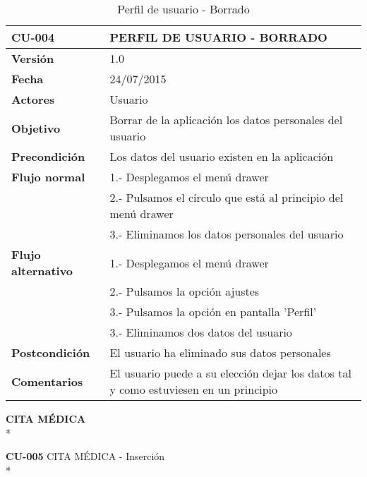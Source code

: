\documentclass[../pfc.tex]{subfiles}
\begin{document}
	\begin{table}[H]
		\centering
		\begin{tabular}[t]{|p{3cm}|p{9.5cm}|}
			\hline \textbf{CU-004} & \textbf{PERFIL DE USUARIO - BORRADO} \\*
			\hline\hline \textbf{Versión} & 1.0 \\*
			\hline\hline \textbf{Fecha} & 24/07/2015 \\*
			\hline\textbf{Actores} 	& Usuario\\*
			\hline \textbf{Objetivo} & Borrar de la aplicación los datos personales del usuario\\* 			
			\hline \textbf{Precondición} & Los datos del usuario existen en la aplicación \\* 
			\hline \textbf{Flujo normal} & 1.- Desplegamos el menú drawer \\* 
			& 2.- Pulsamos el círculo que está al principio del menú drawer\\*	
			& 3.- Eliminamos los datos personales del usuario\\*	
			\hline \textbf{Flujo alternativo} & 1.- Desplegamos el menú drawer \\* 
			& 2.- Pulsamos la opción ajustes \\*	
			& 3.- Pulsamos la opción en pantalla 'Perfil' \\*	
			& 3.- Eliminamos dos datos del usuario\\*	
			\hline \textbf{Postcondición} & El usuario ha eliminado sus datos personales\\* 
			\hline \textbf{Comentarios}   & El usuario puede a su elección dejar los datos tal y como estuviesen en un principio\\* 
			\hline
		\end{tabular}
		\caption{Perfil de usuario - Borrado}
		\label{tabla:caso004}

	\end{table}
	
	\clearpage
	
	\textbf{CITA MÉDICA}\\*

	\textbf{CU-005}	CITA MÉDICA - Inserción\\*
	
\end{document}
